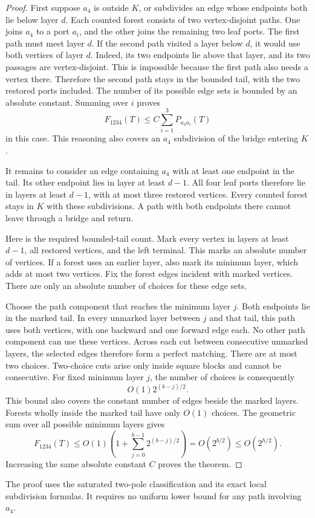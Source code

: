 \begin{proof}
First suppose $a_4$ is outside $K$, or subdivides an edge whose endpoints both lie below layer $d$.
Each counted forest consists of two vertex-disjoint paths.
One joins $a_4$ to a port $a_i$, and the other joins the remaining two leaf ports.
The first path must meet layer $d$.
If the second path visited a layer below $d$, it would use both vertices of layer $d$.
Indeed, its two endpoints lie above that layer, and its two passages are vertex-disjoint.
This is impossible because the first path also needs a vertex there.
Therefore the second path stays in the bounded tail, with the two restored ports included.
The number of its possible edge sets is bounded by an absolute constant.
Summing over $i$ proves
\[
 F_{1234}(T)\le C\sum_{i=1}^3P_{a_4a_i}(T)
\]
in this case.
This reasoning also covers an $a_4$ subdivision of the bridge entering $K$.

It remains to consider an edge containing $a_4$ with at least one endpoint in the tail.
Its other endpoint lies in layer at least $d-1$.
All four leaf ports therefore lie in layers at least $d-1$, with at most three restored vertices.
Every counted forest stays in $K$ with these subdivisions.
A path with both endpoints there cannot leave through a bridge and return.

Here is the required bounded-tail count.
Mark every vertex in layers at least $d-1$, all restored vertices, and the left terminal.
This marks an absolute number of vertices.
If a forest uses an earlier layer, also mark its minimum layer, which adds at most two vertices.
Fix the forest edges incident with marked vertices.
There are only an absolute number of choices for these edge sets.

Choose the path component that reaches the minimum layer $j$.
Both endpoints lie in the marked tail.
In every unmarked layer between $j$ and that tail, this path uses both vertices, with one backward and one forward edge each.
No other path component can use these vertices.
Across each cut between consecutive unmarked layers, the selected edges therefore form a perfect matching.
There are at most two choices.
Two-choice cuts arise only inside square blocks and cannot be consecutive.
For fixed minimum layer $j$, the number of choices is consequently
\[
 O(1)2^{(b-j)/2}.
\]
This bound also covers the constant number of edges beside the marked layers.
Forests wholly inside the marked tail have only $O(1)$ choices.
The geometric sum over all possible minimum layers gives
\[
 F_{1234}(T)
 \le O(1)\left(1+\sum_{j=0}^{b-1}2^{(b-j)/2}\right)
 =O(2^{b/2})\le O(2^{h/2}).
\]
Increasing the same absolute constant $C$ proves the theorem.
\end{proof}

The proof uses the saturated two-pole classification and its exact local subdivision formulas.
It requires no uniform lower bound for any path involving $a_4$.
